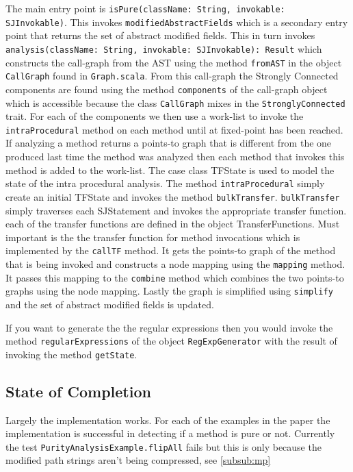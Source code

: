 \documentclass[11pt]{exam}
\begin{document}
The main entry point is \texttt{isPure(className: String, invokable:
SJInvokable)}. This invokes \texttt{modifiedAbstractFields} which is a
secondary entry point that returns the set of abstract modified
fields. This in turn invokes \texttt{analysis(className: String,
invokable: SJInvokable): Result} which constructs the call-graph from
the AST using the method \texttt{fromAST} in the object
\texttt{CallGraph} found in \texttt{Graph.scala}. From this call-graph
the Strongly Connected components are found using the method
\texttt{components} of the call-graph object which is accessible
because the class \texttt{CallGraph}  mixes in the
\texttt{StronglyConnected} trait.  For each of the components we then
use a work-list to invoke the  \texttt{intraProcedural} method on each method
until at fixed-point has  been reached. If analyzing a method returns
a points-to graph that is different from the one produced last time
the method was analyzed then each method that invokes this method is
added to the work-list. The case class TFState is used to model the
state of the intra procedural analysis. The method
\texttt{intraProcedural} simply create an initial  TFState and invokes
the method \texttt{bulkTransfer}. \texttt{bulkTransfer} simply
traverses each SJStatement and invokes the appropriate transfer
function. each of the transfer functions are defined in the object
TransferFunctions. Must important is the the transfer function for method
invocations which is implemented by the \texttt{callTF} method. It gets the
points-to graph of the method that is being invoked and constructs a node
mapping using the \texttt{mapping} method. It passes this mapping to the 
\texttt{combine} method which combines the two points-to graphs using the
node mapping. Lastly the graph is simplified using \texttt{simplify} and 
the set of abstract modified fields is updated. \newline

If you want to generate the the regular expressions then you would
invoke the method \texttt{regularExpressions} of the object
\texttt{RegExpGenerator} with the result of invoking the method
\texttt{getState}.


\newpage

\subsection{State of Completion}

Largely the implementation works. For each of the examples in the
paper the implementation is successful in detecting if a method is
pure or not. Currently the test \texttt{PurityAnalysisExample.flipAll}
fails but this is only because the modified path strings aren't being
compressed, see \ref{subsub:mp}
\end{document}
